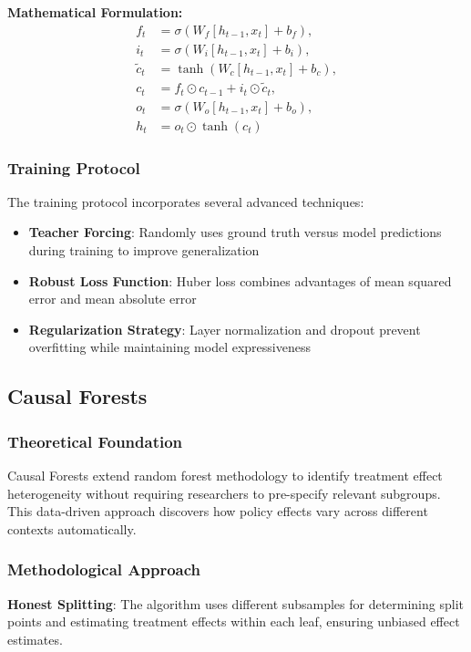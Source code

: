 \textbf{Mathematical Formulation:}
\begin{align}
  f_t &= \sigma(W_f [h_{t-1}, x_t] + b_f), \\
  i_t &= \sigma(W_i [h_{t-1}, x_t] + b_i), \\
  \tilde{c}_t &= \tanh(W_c [h_{t-1}, x_t] + b_c), \\
  c_t &= f_t \odot c_{t-1} + i_t \odot \tilde{c}_t, \\
  o_t &= \sigma(W_o [h_{t-1}, x_t] + b_o), \\
  h_t &= o_t \odot \tanh(c_t)
\end{align}

\subsubsection{Training Protocol}
The training protocol incorporates several advanced techniques:
\begin{itemize}
    \item \textbf{Teacher Forcing}: Randomly uses ground truth versus model predictions during training to improve generalization
    \item \textbf{Robust Loss Function}: Huber loss combines advantages of mean squared error and mean absolute error
    \item \textbf{Regularization Strategy}: Layer normalization and dropout prevent overfitting while maintaining model expressiveness
\end{itemize}

\subsection{Causal Forests}\label{subsec:cforests}

\subsubsection{Theoretical Foundation}
Causal Forests extend random forest methodology to identify treatment effect heterogeneity without requiring researchers to pre-specify relevant subgroups. This data-driven approach discovers how policy effects vary across different contexts automatically.

\subsubsection{Methodological Approach}
\textbf{Honest Splitting}: The algorithm uses different subsamples for determining split points and estimating treatment effects within each leaf, ensuring unbiased effect estimates.

